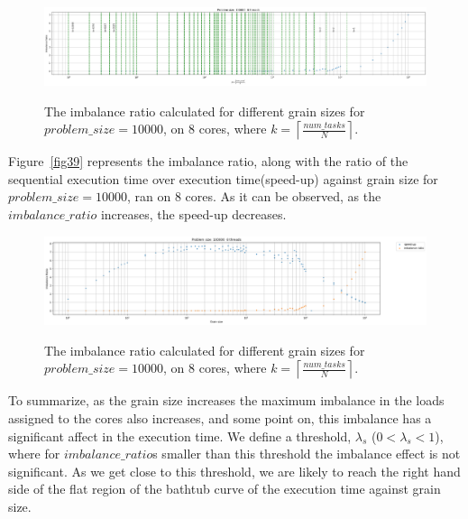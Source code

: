 \vspace{\baselineskip}	
\begin{figure}[H]
	\centering
	{\includegraphics[scale=.25]{images/hpx_for_loop/w_c_all.png}}
	\caption{The imbalance ratio calculated for different grain sizes for $problem\_size=10000$, on 8 cores, where $k=\left\lceil{\frac{num\_{tasks}}{N}}\right \rceil$.}\label{fig38}		
\end{figure}



Figure~\ref{fig39} represents the imbalance ratio, along with the ratio of the sequential execution time over execution time(speed-up) against grain size for $problem\_size=10000$, ran on 8 cores.   
As it can be observed, as the $imbalance\_{ratio}$ increases, the speed-up decreases. 

\vspace{\baselineskip}	
\begin{figure}[H]
	\centering
	{\includegraphics[scale=.3]{images/hpx_for_loop/w_c_speedup.png}}
	\caption{The imbalance ratio calculated for different grain sizes for $problem\_size=10000$, on 8 cores, where $k=\left\lceil{\frac{num\_{tasks}}{N}}\right \rceil$.}\label{fig37}		
\end{figure}


To summarize, as the grain size increases the maximum imbalance in the loads assigned to the cores also increases, and some point on, this imbalance has a significant affect in the execution time. We define a threshold, $\lambda_s$ ($0<\lambda_s<1$), where for $imbalance\_{ratio}$s smaller than this threshold the imbalance effect is not significant. As we get close to this threshold, we are likely to reach the right hand side of the flat region of the bathtub curve of the execution time against grain size. 


